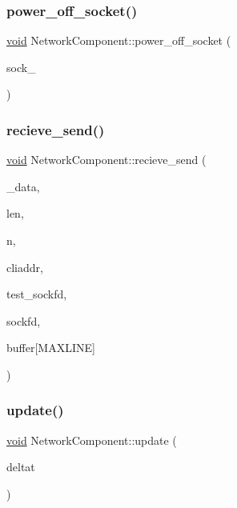 \subsubsection{\texorpdfstring{power\+\_\+off\+\_\+socket()}{power\_off\_socket()}}
{\footnotesize\ttfamily \hyperlink{imgui__impl__opengl3__loader_8h_ac668e7cffd9e2e9cfee428b9b2f34fa7}{void} Network\+Component\+::power\+\_\+off\+\_\+socket (\begin{DoxyParamCaption}\item[{int \&}]{sock\+\_\+ }\end{DoxyParamCaption})}

\mbox{\label{classNetworkComponent_a3ebbb8337b471ad872eede4e76cd2b45}} 
\subsubsection{\texorpdfstring{recieve\+\_\+send()}{recieve\_send()}}
{\footnotesize\ttfamily \hyperlink{imgui__impl__opengl3__loader_8h_ac668e7cffd9e2e9cfee428b9b2f34fa7}{void} Network\+Component\+::recieve\+\_\+send (\begin{DoxyParamCaption}\item[{\hyperlink{structGameData}{Game\+Data} $\ast$}]{\+\_\+data,  }\item[{socklen\+\_\+t \&}]{len,  }\item[{int \&}]{n,  }\item[{struct sockaddr\+\_\+in \&}]{cliaddr,  }\item[{int \&}]{test\+\_\+sockfd,  }\item[{int \&}]{sockfd,  }\item[{char}]{buffer\mbox{[}\+M\+A\+X\+L\+I\+N\+E\mbox{]} }\end{DoxyParamCaption})}

\mbox{\label{classNetworkComponent_ae731efcb319689aa9848ad8631ddfffc}} 
\subsubsection{\texorpdfstring{update()}{update()}}
{\footnotesize\ttfamily \hyperlink{imgui__impl__opengl3__loader_8h_ac668e7cffd9e2e9cfee428b9b2f34fa7}{void} Network\+Component\+::update (\begin{DoxyParamCaption}\item[{const float}]{deltat }\end{DoxyParamCaption})\hspace{0.3cm}{\ttfamily [virtual]}}



